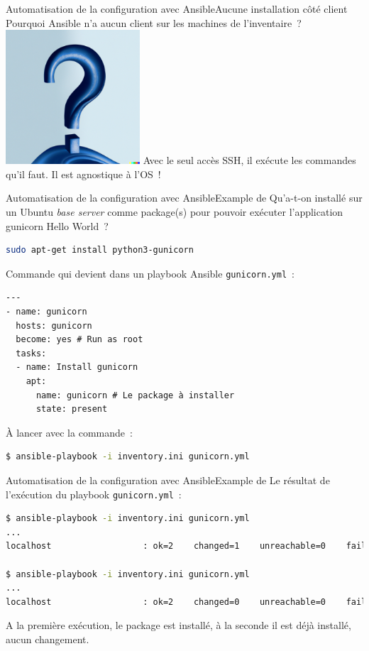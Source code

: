 \documentclass{beamer}
\begin{document}
    \begin{frame}{Automatisation de la configuration avec Ansible}{Aucune installation côté client}
        Pourquoi Ansible n'a aucun client sur les machines de l'inventaire~?
        \bigbreak
        \centering
        \includegraphics[width=5cm]{image/question-mark-on-a-blank-background}
        \bigbreak
        \pause
        \flushleft
        Avec le seul accès SSH, il exécute les commandes qu'il faut.
        Il est agnostique à l'OS~!
    \end{frame}

    \begin{frame}[fragile]{Automatisation de la configuration avec Ansible}{Example de }
        Qu'a-t-on installé sur un Ubuntu \textit{base server} comme package(s) pour pouvoir exécuter l'application gunicorn Hello World~?
        \pause
        \begin{lstlisting}[language=bash]
sudo apt-get install python3-gunicorn
        \end{lstlisting}
        Commande qui devient dans un playbook Ansible \lstinline{gunicorn.yml}~:
        \begin{lstlisting}
---
- name: gunicorn
  hosts: gunicorn
  become: yes # Run as root
  tasks:
  - name: Install gunicorn
    apt:
      name: gunicorn # Le package à installer
      state: present
        \end{lstlisting}
        À lancer avec la commande~:
        \begin{lstlisting}[language=bash]
$ ansible-playbook -i inventory.ini gunicorn.yml
        \end{lstlisting}
    \end{frame}

    \begin{frame}[fragile]{Automatisation de la configuration avec Ansible}{Example de }
        Le résultat de l'exécution du playbook \lstinline{gunicorn.yml}~:
        \begin{lstlisting}[language=bash]
$ ansible-playbook -i inventory.ini gunicorn.yml
...
localhost                  : ok=2    changed=1    unreachable=0    failed=0    skipped=0    rescued=0    ignored=0

$ ansible-playbook -i inventory.ini gunicorn.yml
...
localhost                  : ok=2    changed=0    unreachable=0    failed=0    skipped=0    rescued=0    ignored=0
        \end{lstlisting}
        A la première exécution, le package est installé, à la seconde il est déjà installé, aucun changement.
    \end{frame}
\end{document}
